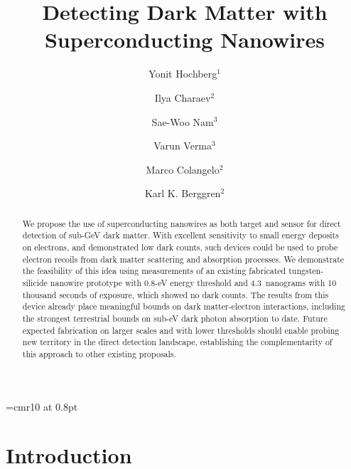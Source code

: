 \documentclass[twocolumn,10pt,prl,nofootinbib,preprintnumbers]{revtex4-1}
\begin{document}
\font\mini=cmr10 at 0.8pt

\title{
Detecting Dark Matter with Superconducting Nanowires
}


\author{Yonit Hochberg${}^{1}$}
\author{Ilya Charaev${}^{2}$}
\author{Sae-Woo Nam${}^3$}
\author{Varun Verma${}^3$}
\author{Marco Colangelo${}^{2}$}
\author{Karl K. Berggren${}^{2}$}




\begin{abstract}

We propose the use of superconducting nanowires as both target and
sensor for direct detection of sub-GeV dark matter. With excellent sensitivity to
small energy deposits on electrons, and demonstrated low dark counts,
such devices could be used to probe electron recoils from dark matter
scattering and absorption processes. 
We demonstrate the feasibility of
this idea using measurements of an existing fabricated tungsten-silicide nanowire
prototype with 0.8-eV energy threshold and 4.3~nanograms with 10 thousand seconds of exposure, which showed no dark counts. The results from this device already place
meaningful bounds on dark matter-electron interactions, including the strongest
terrestrial bounds on sub-eV dark photon absorption to date.
Future expected
fabrication on larger scales and with lower thresholds should enable probing new territory in
the direct detection landscape, establishing the complementarity of
this approach to other existing proposals.
\end{abstract}

\maketitle


\section{Introduction}
\end{document}
